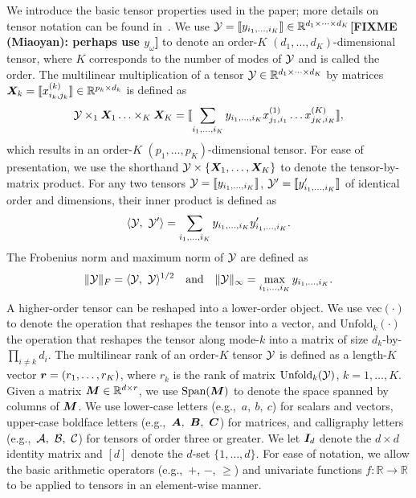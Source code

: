 \documentclass[12pt]{article}
\theoremstyle{plain}
\theoremstyle{definition}
\def\fixme#1#2{\textbf{\color{red}[FIXME (#1): #2]}}
\begin{document}
We introduce the basic tensor properties used in the paper; more details on tensor notation can be found in~\citet{kolda2009tensor}. We use $\mathcal{Y}=\llbracket y_{i_1,\ldots,i_K} \rrbracket\in \mathbb{R}^{d_1\times \cdots\times d_K}$\fixme{Miaoyan}{perhaps use $y_\omega$} to denote an order-$K$ $(d_1,\ldots,d_K)$-dimensional tensor, where $K$ corresponds to the number of modes of $\mathcal{Y}$ and is called the order. The multilinear multiplication of a tensor $\mathcal{Y}\in\mathbb{R}^{d_1\times \cdots\times d_K}$ by matrices $\bm X_k=\llbracket x_{i_k,j_k}^{(k)} \rrbracket\in\mathbb{R}^{p_k\times d_k}$ is defined as
\begin{equation}
\mathcal{Y} \times_1\bm X_1\ldots \times_K \bm X_K=\llbracket \sum_{i_1,\ldots,i_K}y_{i_1,\ldots,i_K}x_{j_1,i_1}^{(1)}\ldots x_{j_K,i_K}^{(K)} \rrbracket,
\end{equation}
which results in an order-$K$ $(p_1,\ldots,p_K)$-dimensional tensor. For ease of presentation, we use the shorthand $\mathcal{Y}\times\{\bm X_1,\ldots,\bm X_K\}$ to denote the tensor-by-matrix product. For any two tensors $\mathcal{Y}=\llbracket y_{i_1,\ldots,i_K} \rrbracket$, $\mathcal{Y}'=\llbracket y'_{i_1,\ldots,i_K} \rrbracket$ of identical order and dimensions, their inner product is defined as 
\[
\langle \mathcal{Y},\ \mathcal{Y}'\rangle =\sum_{i_1,\ldots,i_K}y_{i_1,\ldots,i_K}y'_{i_1,\ldots,i_K}.
\] 
The Frobenius norm and maximum norm of $\mathcal{Y}$ are defined as 
\[
\lVert\mathcal{Y}\rVert_F=\langle \mathcal{Y},\ \mathcal{Y} \rangle^{1/2}\quad \text{and}\quad \lVert\mathcal{Y}\rVert_\infty=\max_{i_1,\ldots,i_K}y_{i_1,\ldots,i_K}.
\]
 A higher-order tensor can be reshaped into a lower-order object. We use $\text{vec}(\cdot)$ to denote the operation that reshapes the tensor into a vector, and $\text{Unfold}_k(\cdot)$ the operation that reshapes the tensor along mode-$k$ into a matrix of size $d_k$-by-$\prod_{i\neq k}d_i$. The multilinear rank of an order-$K$ tensor $\mathcal{Y}$ is defined as a length-$K$ vector $\bm{r}=(r_1,\ldots,r_K)$, where $r_k$ is the rank of matrix $\text{Unfold}_k(\mathcal{Y})$, $k=1,\ldots,K$. Given a matrix $\bm M\in\mathbb{R}^{d\times r}$, we use $\text{Span}(\bm M)$ to denote the space spanned by columns of $\bm M$. We use lower-case letters (e.g.,\ $a,\ b,\ c$) for scalars and vectors, upper-case boldface letters (e.g.,\ $\bm A,\ \bm B,\ \bm C$) for matrices, and calligraphy letters (e.g.,\ $\tA,\ \tB,\  \tC$) for tensors of order three or greater. We let $\bm I_d$ denote the $d \times d$ identity matrix and $[d]$ denote the $d$-set $\{1,\ldots,d\}$. For ease of notation, we allow the basic arithmetic operators (e.g.,\ $+$, $-$, $\geq $) and univariate 
functions $f\colon \mathbb{R}\to \mathbb{R}$ to be applied to tensors in an element-wise manner.
\end{document}
